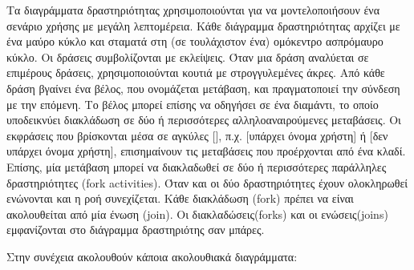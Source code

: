 		Τα διαγράμματα δραστηριότητας χρησιμοποιούνται για να μοντελοποιήσουν ένα σενάριο χρήσης με μεγάλη λεπτομέρεια. Κάθε διάγραμμα δραστηριότητας αρχίζει με ένα μαύρο κύκλο και σταματά στη (σε τουλάχιστον ένα) ομόκεντρο ασπρόμαυρο κύκλο. Οι δράσεις συμβολίζονται με εκλείψεις. Όταν μια δράση αναλύεται σε επιμέρους δράσεις, χρησιμοποιούνται κουτιά με στρογγυλεμένες άκρες. Από κάθε δράση βγαίνει ένα βέλος, που ονομάζεται μετάβαση, και πραγματοποιεί την σύνδεση με την επόμενη. Το βέλος μπορεί επίσης να οδηγήσει σε ένα διαμάντι, το οποίο υποδεικνύει διακλάδωση σε δύο ή περισσότερες αλληλοαναιρούμενες μεταβάσεις. Οι εκφράσεις που βρίσκονται μέσα σε αγκύλες [], π.χ. [υπάρχει όνομα χρήστη] ή [δεν υπάρχει όνομα χρήστη], επισημαίνουν τις μεταβάσεις που προέρχονται από ένα κλαδί. Επίσης, μία μετάβαση μπορεί να διακλαδωθεί σε δύο ή περισσότερες παράλληλες δραστηριότητες (fork activities). Όταν και οι δύο δραστηριότητες έχουν ολοκληρωθεί ενώνονται και  η ροή συνεχίζεται. Κάθε διακλάδωση (fork) πρέπει να είναι ακολουθείται από μία ένωση (join). Οι διακλαδώσεις(forks) και οι ενώσεις(joins) εμφανίζονται στο διάγραμμα δραστηριότης σαν μπάρες.

		Στην συνέχεια ακολουθούν κάποια ακολουθιακά διαγράμματα:
		
